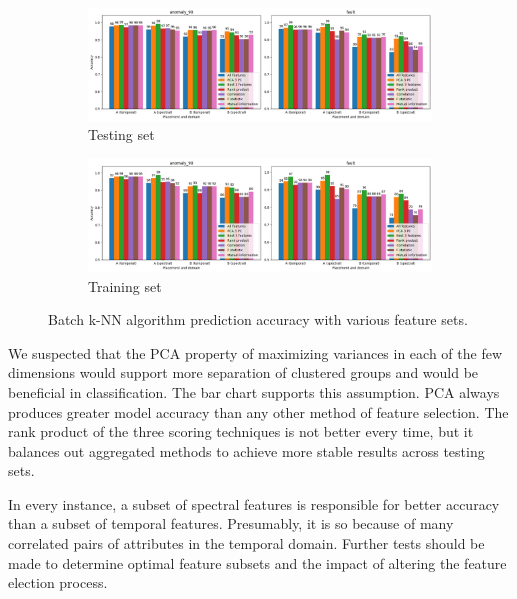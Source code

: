 \begin{figure}[ht]
    \centering
    \begin{subfigure}[b]{\textwidth}
        \includegraphics[width=\textwidth]{assets/design/KNN-feature-selection-predictions-train.png}
        \caption{Testing set}
    \end{subfigure}
    \hfill
    \begin{subfigure}[b]{\textwidth}
        \includegraphics[width=\textwidth]{assets/design/KNN-feature-selection-predictions-test.png}
        \caption{Training set}
    \end{subfigure} 
    \caption{Batch k-NN algorithm prediction accuracy with various feature sets.}
    \label{fig:design:KNN-accuracy-batch}
\end{figure} 

We suspected that the PCA property of maximizing variances in each of the few dimensions would support more separation of clustered groups and would be beneficial in classification. The bar chart supports this assumption. PCA always produces greater model accuracy than any other method of feature selection. The rank product of the three scoring techniques is not better every time, but it balances out aggregated methods to achieve more stable results across testing sets. 

In every instance, a subset of spectral features is responsible for better accuracy than a subset of temporal features. Presumably, it is so because of many correlated pairs of attributes in the temporal domain. Further tests should be made to determine optimal feature subsets and the impact of altering the feature election process.


